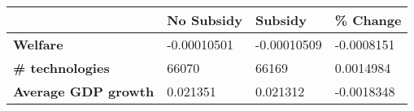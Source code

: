 \begin{tabular}{|l|l|l|l|}
\hline
&\textbf{No Subsidy}&\textbf{Subsidy}&\textbf{\% Change}\\\hline
\textbf{Welfare}&-0.00010501&-0.00010509&-0.0008151\\\hline
\textbf{\# technologies}&66070&66169&0.0014984\\\hline
\textbf{Average GDP growth}&0.021351&0.021312&-0.0018348\\\hline
\end{tabular}
